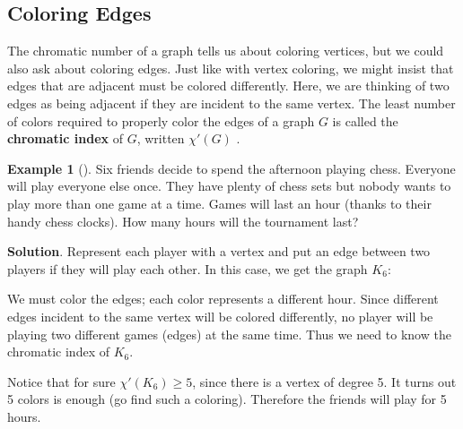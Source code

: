 \documentclass[10pt,]{book}
\newcommand{\terminology}[1]{\textbf{#1}}
\theoremstyle{plain}
\theoremstyle{definition}
\theoremstyle{definition}
\newtheorem{example}[theorem]{Example}
\theoremstyle{definition}
\theoremstyle{definition}
\numberwithin{equation}{chapter}
\newcommand{\vtx}[2]{node[fill,circle,inner sep=0pt, minimum size=4pt,label=#1:#2]{}}
\renewcommand{\v}{\vtx{above}{}}
\begin{document}
\subsection[{Coloring Edges}]{Coloring Edges}\label{subsection-11}
\hypertarget{p-337}{}%
The chromatic number of a graph tells us about coloring vertices, but we could also ask about coloring edges. Just like with vertex coloring, we might insist that edges that are adjacent must be colored differently. Here, we are thinking of two edges as being adjacent if they are incident to the same vertex. The least number of colors required to properly color the edges of a graph \(G\) is called the \terminology{chromatic index} of \(G\), written \(\chi'(G)\)\label{notation-8}
.%
\begin{example}[]\label{example-10}
\hypertarget{p-338}{}%
Six friends decide to spend the afternoon playing chess. Everyone will play everyone else once. They have plenty of chess sets but nobody wants to play more than one game at a time. Games will last an hour (thanks to their handy chess clocks). How many hours will the tournament last?%
\par\smallskip%
\noindent\textbf{Solution}.\hypertarget{solution-33}{}\quad%
\hypertarget{p-339}{}%
Represent each player with a vertex and put an edge between two players if they will play each other. In this case, we get the graph \(K_6\):%
\begin{sidebyside}{1}{0.4}{0.4}{0}
\begin{sbspanel}{0.2}
\resizebox{\linewidth}{!}{{
\begin{tikzpicture}
	\foreach \x in {0,...,5}{

		\foreach \y in {1,...,5}{
		 \draw (\x*60:1) -- (\x*60+\y*60:1);
		}
	\draw (\x*60:1) \v;
	}
	\end{tikzpicture}
}
}
\end{sbspanel}
\end{sidebyside}
\par
\hypertarget{p-340}{}%
We must color the edges; each color represents a different hour. Since different edges incident to the same vertex will be colored differently, no player will be playing two different games (edges) at the same time. Thus we need to know the chromatic index of \(K_6\).%
\par
\hypertarget{p-341}{}%
Notice that for sure \(\chi'(K_6) \ge 5\), since there is a vertex of degree 5. It turns out 5 colors is enough (go find such a coloring). Therefore the friends will play for 5 hours.%
\end{example}
\end{document}
